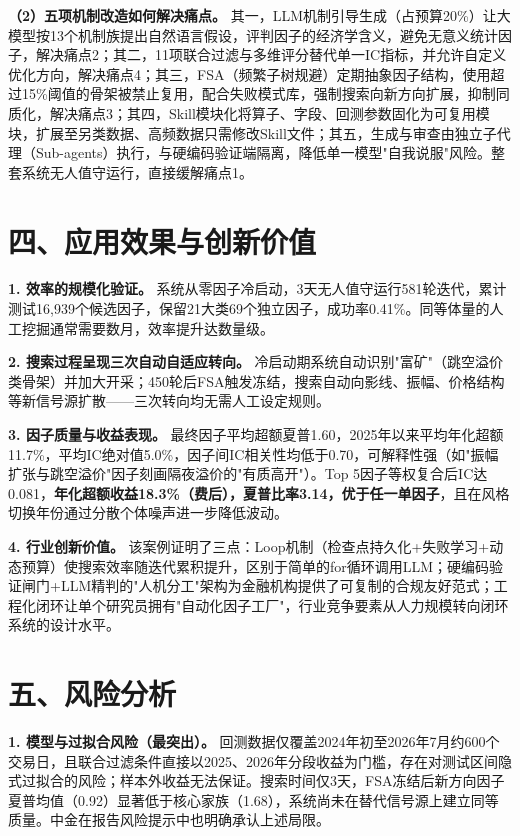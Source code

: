 \documentclass[UTF8,a4paper,zihao=-4,fontset=fandol]{ctexart}
\begin{document}
\textbf{（2）五项机制改造如何解决痛点。} 其一，LLM机制引导生成（占预算20\%）让大模型按13个机制族提出自然语言假设，评判因子的经济学含义，避免无意义统计因子，解决痛点2；其二，11项联合过滤与多维评分替代单一IC指标，并允许自定义优化方向，解决痛点4；其三，FSA（频繁子树规避）定期抽象因子结构，使用超过15\%阈值的骨架被禁止复用，配合失败模式库，强制搜索向新方向扩展，抑制同质化，解决痛点3；其四，Skill模块化将算子、字段、回测参数固化为可复用模块，扩展至另类数据、高频数据只需修改Skill文件；其五，生成与审查由独立子代理（Sub-agents）执行，与硬编码验证端隔离，降低单一模型"自我说服"风险\cite{cicc-loop-2026}。整套系统无人值守运行，直接缓解痛点1。

\section{四、应用效果与创新价值}
\textbf{1. 效率的规模化验证。} 系统从零因子冷启动，3天无人值守运行581轮迭代，累计测试16,939个候选因子，保留21大类69个独立因子，成功率0.41\%\cite{cicc-loop-2026}。同等体量的人工挖掘通常需要数月，效率提升达数量级。

\textbf{2. 搜索过程呈现三次自动自适应转向。} 冷启动期系统自动识别"富矿"（跳空溢价类骨架）并加大开采；450轮后FSA触发冻结，搜索自动向影线、振幅、价格结构等新信号源扩散——三次转向均无需人工设定规则\cite{cicc-loop-2026}。

\textbf{3. 因子质量与收益表现。} 最终因子平均超额夏普1.60，2025年以来平均年化超额11.7\%，平均IC绝对值5.0\%，因子间IC相关性均低于0.70，可解释性强（如"振幅扩张与跳空溢价"因子刻画隔夜溢价的"有质高开"）。Top 5因子等权复合后IC达0.081，\textbf{年化超额收益18.3\%（费后），夏普比率3.14，优于任一单因子}，且在风格切换年份通过分散个体噪声进一步降低波动\cite{cicc-loop-2026}。

\textbf{4. 行业创新价值。} 该案例证明了三点：Loop机制（检查点持久化+失败学习+动态预算）使搜索效率随迭代累积提升，区别于简单的for循环调用LLM；硬编码验证闸门+LLM精判的"人机分工"架构为金融机构提供了可复制的合规友好范式；工程化闭环让单个研究员拥有"自动化因子工厂"，行业竞争要素从人力规模转向闭环系统的设计水平\cite{cicc-loop-2026}\cite{ky-factor-mining}。

\section{五、风险分析}
\textbf{1. 模型与过拟合风险（最突出）。} 回测数据仅覆盖2024年初至2026年7月约600个交易日，且联合过滤条件直接以2025、2026年分段收益为门槛，存在对测试区间隐式过拟合的风险；样本外收益无法保证。搜索时间仅3天，FSA冻结后新方向因子夏普均值（0.92）显著低于核心家族（1.68），系统尚未在替代信号源上建立同等质量。中金在报告风险提示中也明确承认上述局限\cite{cicc-loop-2026}。
\end{document}
